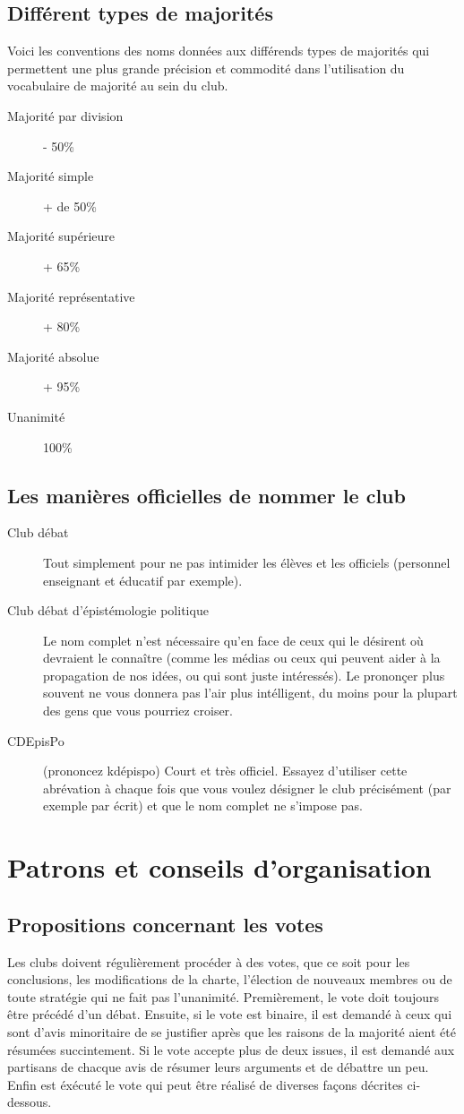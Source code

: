 \documentclass[a4paper,12pt]{article}
\begin{document}
\subsection{Différent types de majorités}
Voici les conventions des noms données aux différends types de majorités qui permettent une plus grande précision et commodité dans l'utilisation du vocabulaire de majorité au sein du club.
\begin{description}
 \item [Majorité par division] - 50\%
 \item [Majorité simple] + de 50\%
 \item [Majorité supérieure] + 65\%
 \item [Majorité représentative] + 80\%
 \item [Majorité absolue] + 95\%
 \item [Unanimité] 100\%
\end{description}

\subsection{Les manières officielles de nommer le club}
\begin{description}
  \item [Club débat] Tout simplement pour ne pas intimider les élèves et les officiels (personnel enseignant et éducatif par exemple).
  \item [Club débat d'épistémologie politique] Le nom complet n'est nécessaire qu'en face de ceux qui le désirent où devraient le connaître (comme les médias ou ceux qui peuvent aider à la propagation de nos idées, ou qui sont juste intéressés). Le prononçer plus souvent ne vous donnera pas l'air plus intélligent, du moins pour la plupart des gens que vous pourriez croiser. 
  \item [CDEpisPo] (prononcez kdépispo)  Court et très officiel. Essayez d'utiliser cette abrévation à chaque fois que vous voulez désigner le club précisément (par exemple par écrit) et que le nom complet ne s'impose pas.
\end{description}

\section{Patrons et conseils d'organisation}

\subsection{Propositions concernant les votes}
Les clubs doivent régulièrement procéder à des votes, que ce soit pour les conclusions, les modifications de la charte, l'élection de nouveaux membres ou de toute stratégie qui ne fait pas l'unanimité.
Premièrement, le vote doit toujours être précédé d'un débat. Ensuite, si le vote est binaire, il est demandé à ceux qui sont d'avis minoritaire de se justifier après que les raisons de la majorité aient été résumées succintement. Si le vote accepte plus de deux issues, il est demandé aux partisans de chacque avis de résumer leurs arguments et de débattre un peu. Enfin est éxécuté le vote qui peut être réalisé de diverses façons décrites ci-dessous.
\end{document}
